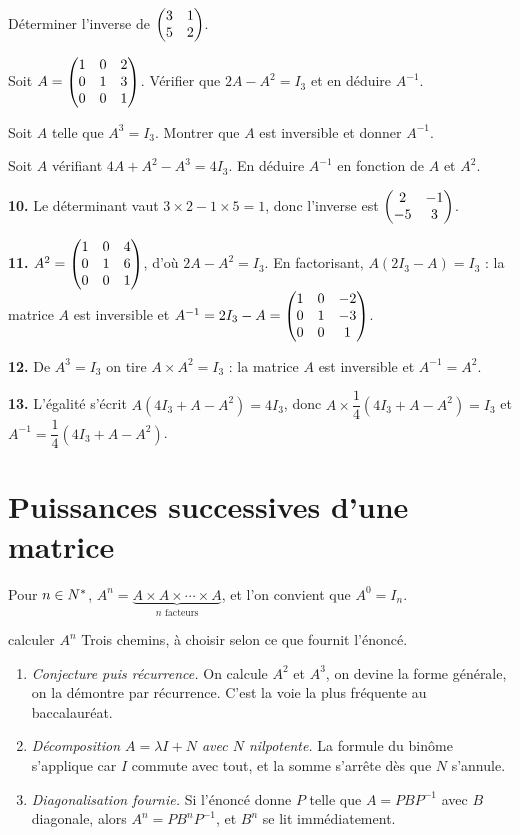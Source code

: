 \begin{entrainement}[inverse]
\exo[\niveau{1}] Déterminer l'inverse de $\begin{pmatrix} 3 & 1 \\ 5 & 2 \end{pmatrix}$.

\exo[\niveau{2}] Soit $A = \begin{pmatrix} 1 & 0 & 2 \\ 0 & 1 & 3 \\ 0 & 0 & 1 \end{pmatrix}$. Vérifier que
$2A-A^{2} = I_{3}$ et en déduire $A^{-1}$.

\exo[\niveau{2}] Soit $A$ telle que $A^{3} = I_{3}$. Montrer que $A$ est
inversible et donner $A^{-1}$.

\exo[\niveau{3}] Soit $A$ vérifiant $4A+A^{2}-A^{3} = 4I_{3}$. En déduire
$A^{-1}$ en fonction de $A$ et $A^{2}$.
\end{entrainement}

\begin{corrige}
\textbf{10.} Le déterminant vaut $3\times2-1\times5 = 1$, donc l'inverse est
$\begin{pmatrix} 2 & -1 \\ -5 & 3 \end{pmatrix}$.

\textbf{11.} $A^{2} = \begin{pmatrix} 1 & 0 & 4 \\ 0 & 1 & 6 \\ 0 & 0 & 1 \end{pmatrix}$, d'où
$2A-A^{2} = I_{3}$. En factorisant, $A\left(2I_{3}-A\right) = I_{3}$ : la
matrice $A$ est inversible et
$A^{-1} = 2I_{3}-A = \begin{pmatrix} 1 & 0 & -2 \\ 0 & 1 & -3 \\ 0 & 0 & 1 \end{pmatrix}$.

\textbf{12.} De $A^{3} = I_{3}$ on tire $A \times A^{2} = I_{3}$ : la matrice
$A$ est inversible et $A^{-1} = A^{2}$.

\textbf{13.} L'égalité s'écrit
$A\left(4I_{3}+A-A^{2}\right) = 4I_{3}$, donc
$A \times \dfrac14\left(4I_{3}+A-A^{2}\right) = I_{3}$ et
$A^{-1} = \dfrac14\left(4I_{3}+A-A^{2}\right)$.
\end{corrige}

\section{Puissances successives d'une matrice}

\begin{definition}[puissance]
Pour $n \in N^{*}$, $A^{n} = \underbrace{A \times A \times \cdots \times A}_{n
\text{ facteurs}}$, et l'on convient que $A^{0} = I_{n}$.
\end{definition}

\begin{methode}{calculer $A^{n}$}
Trois chemins, à choisir selon ce que fournit l'énoncé.
\begin{enumerate}[label=\textbf{\arabic*.}, leftmargin=*, itemsep=0.15em]
  \item \emph{Conjecture puis récurrence.} On calcule $A^{2}$ et $A^{3}$, on
        devine la forme générale, on la démontre par récurrence. C'est la voie
        la plus fréquente au baccalauréat.
  \item \emph{Décomposition $A = \lambda I+N$ avec $N$ nilpotente.} La formule
        du binôme s'applique car $I$ commute avec tout, et la somme s'arrête
        dès que $N$ s'annule.
  \item \emph{Diagonalisation fournie.} Si l'énoncé donne $P$ telle que
        $A = PBP^{-1}$ avec $B$ diagonale, alors $A^{n} = PB^{n}P^{-1}$, et
        $B^{n}$ se lit immédiatement.
\end{enumerate}
\end{methode}

